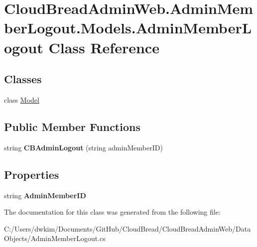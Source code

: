 \hypertarget{a00011}{}\section{Cloud\+Bread\+Admin\+Web.\+Admin\+Member\+Logout.\+Models.\+Admin\+Member\+Logout Class Reference}
\label{a00011}
\subsection*{Classes}
\begin{DoxyCompactItemize}
\item 
class \hyperlink{a00161}{Model}
\end{DoxyCompactItemize}
\subsection*{Public Member Functions}
\begin{DoxyCompactItemize}
\item 
string {\bfseries C\+B\+Admin\+Logout} (string admin\+Member\+ID)\hypertarget{a00011_a6d6217d3c644febc1d52adb1c66756cc}{}\label{a00011_a6d6217d3c644febc1d52adb1c66756cc}

\end{DoxyCompactItemize}
\subsection*{Properties}
\begin{DoxyCompactItemize}
\item 
string {\bfseries Admin\+Member\+ID}\hypertarget{a00011_a58f35da010d962811a25a4ce6b7a34d5}{}\label{a00011_a58f35da010d962811a25a4ce6b7a34d5}

\end{DoxyCompactItemize}


The documentation for this class was generated from the following file\+:\begin{DoxyCompactItemize}
\item 
C\+:/\+Users/dwkim/\+Documents/\+Git\+Hub/\+Cloud\+Bread/\+Cloud\+Bread\+Admin\+Web/\+Data\+Objects/Admin\+Member\+Logout.\+cs\end{DoxyCompactItemize}
